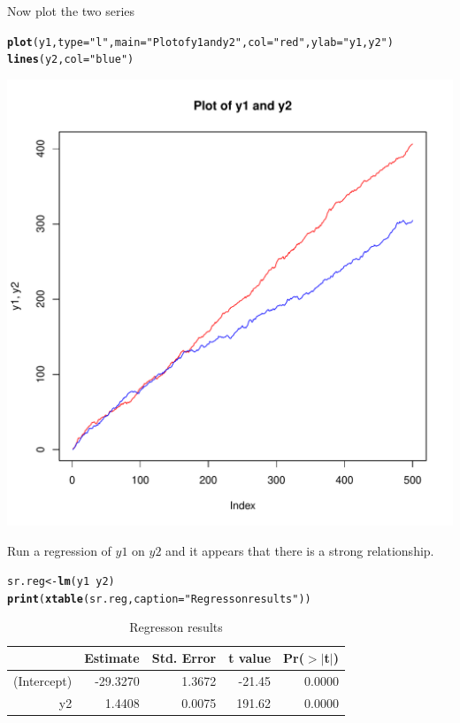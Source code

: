 \documentclass{article}\usepackage{graphicx, color}
\makeatletter
\def\maxwidth{ %
  \ifdim\Gin@nat@width>\linewidth
    \linewidth
  \else
    \Gin@nat@width
  \fi
}
\newcommand{\hlfunctioncall}[1]{\textcolor[rgb]{0.501960784313725,0,0.329411764705882}{\textbf{#1}}}%
\newcommand{\hlstring}[1]{\textcolor[rgb]{0.6,0.6,1}{#1}}%
\newenvironment{kframe}{%
 \def\at@end@of@kframe{}%
 \ifinner\ifhmode%
  \def\at@end@of@kframe{\end{minipage}}%
  \begin{minipage}{\columnwidth}%
 \fi\fi%
 \def\FrameCommand##1{\hskip\@totalleftmargin \hskip-\fboxsep
 \colorbox{shadecolor}{##1}\hskip-\fboxsep
     \hskip-\linewidth \hskip-\@totalleftmargin \hskip\columnwidth}%
 \MakeFramed {\advance\hsize-\width
   \@totalleftmargin\z@ \linewidth\hsize
   \@setminipage}}%
 {\par\unskip\endMakeFramed%
 \at@end@of@kframe}
\newenvironment{knitrout}{}{} %
\makeatother
\begin{document}
Now plot the two series
\begin{knitrout}
\color{fgcolor}\begin{kframe}
\begin{alltt}
\hlfunctioncall{plot}(y1, type = \hlstring{"l"}, main = \hlstring{"Plot of y1 and y2"}, col = \hlstring{"red"}, ylab = \hlstring{"y1, y2"})
\hlfunctioncall{lines}(y2, col = \hlstring{"blue"})
\end{alltt}
\end{kframe}
\includegraphics[width=\maxwidth]{figure/plot} 

\end{knitrout}

Run a regression of $y1$ on $y2$ and it appears that there is a strong relationship.  
\begin{kframe}
\begin{alltt}
sr.reg <- \hlfunctioncall{lm}(y1 ~ y2)
\hlfunctioncall{print}(\hlfunctioncall{xtable}(sr.reg, caption = \hlstring{"Regresson results"}))
\end{alltt}
\end{kframe}%
\begin{table}[ht]
\begin{center}
\begin{tabular}{rrrrr}
  \hline
 & Estimate & Std. Error & t value & Pr($>$$|$t$|$) \\ 
  \hline
(Intercept) & -29.3270 & 1.3672 & -21.45 & 0.0000 \\ 
  y2 & 1.4408 & 0.0075 & 191.62 & 0.0000 \\ 
   \hline
\end{tabular}
\caption{Regresson results}
\end{center}
\end{table}
\end{document}

